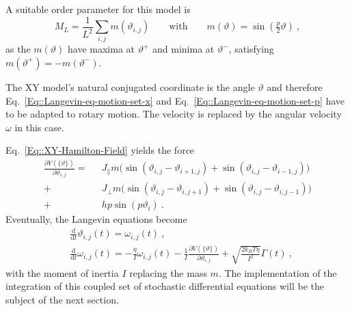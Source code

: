 	A suitable order parameter for this model is
	\begin{equation} \label{Eq::Si-Order-Param}
		M_L =	\frac{1}{L^2} \sum_{i,j} m(\vartheta_{i, j}) \qquad \text{with} \qquad	m(\vartheta) =	\sin \left(\tfrac{p}{2} \vartheta\right) ~,
	\end{equation}
	as the $m(\vartheta)$ have maxima at $\vartheta^{+}$ and minima at $\vartheta^{-}$, satisfying $m(\vartheta^+) =	- m (\vartheta^-)$.
	
	The XY model's natural conjugated coordinate is the angle $\vartheta$ and therefore Eq.~\eqref{Eq::Langevin-eq-motion-set-x} and Eq.~\eqref{Eq::Langevin-eq-motion-set-p} have to be adapted to rotary motion. The velocity is replaced by the angular velocity $\omega$ in this case.
	
	Eq.~\eqref{Eq::XY-Hamilton-Field} yields the force
	\begin{equation} \label{Eq::Potential-Derivative}
		\begin{split}
			\frac{\partial V(\{\vartheta\})}{\partial \vartheta_{i, j}} = ~~~& J_\parallel m \Big( \sin \left(\vartheta_{i,j} - \vartheta_{i + 1, j} \right) +   \sin \left(\vartheta_{i,j} - \vartheta_{i-1, j} \right) \Big)	 \\
			+ &J_\perp m \Big( \sin \left(\vartheta_{i,j} - \vartheta_{i, j+1} \right) +  \sin \left(\vartheta_{i,j} - \vartheta_{i, j-1} \right) \Big) \\
			+ &h p \sin(p\vartheta_i)~.
		\end{split}
	\end{equation}
	Eventually, the Langevin equations become
	\begin{align}
		&\frac{\text{d}}{\text{d}t} \vartheta_{i,j}(t) =	 \omega_{i,j}(t)~, \label{Eq::Si-Langevin-theta} \\
		&\frac{\text{d}}{\text{d}t} \omega_{i,j}(t) =	- \frac{\eta}{I} \omega_{i,j}(t) - \frac{1}{I}\frac{\partial V(\{\vartheta\})}{\partial \vartheta_{i,j}} + \sqrt{\frac{2 k_B T \eta}{I^2}} \Gamma(t)~, \label{Eq::Si-Langevin-omega}
	\end{align}
	with the moment of inertia $I$ replacing the mass $m$. The implementation of the integration of this coupled set of stochastic differential equations will be the subject of the next section.
